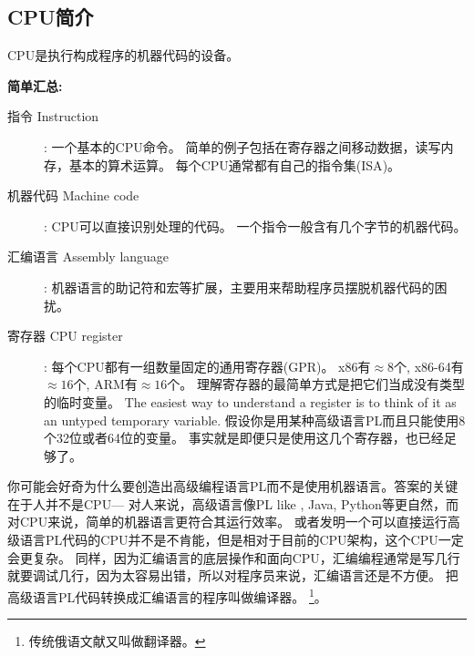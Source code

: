 \documentclass[UTF8,nofonts]{ctexart}
\begin{document}

\subsection{CPU简介}

\ac{CPU}是执行构成程序的机器代码的设备。

\textbf{简单汇总:}

\begin{description}
\item[指令 Instruction]: 一个基本的\ac{CPU}命令。
简单的例子包括在寄存器之间移动数据，读写内存，基本的算术运算。
每个\ac{CPU}通常都有自己的指令集(\ac{ISA})。

\item[机器代码 Machine code]: \ac{CPU}可以直接识别处理的代码。
一个指令一般含有几个字节的机器代码。
\item[汇编语言 Assembly language]: 机器语言的助记符和宏等扩展，主要用来帮助程序员摆脱机器代码的困扰。
\item[寄存器 CPU register]: 每个\ac{CPU}都有一组数量固定的通用寄存器(\ac{GPR})。
x86有$\approx 8$个, x86-64有$\approx 16$个, ARM有$\approx 16$个。
理解寄存器的最简单方式是把它们当成没有类型的临时变量。
The easiest way to understand a register is to think of it as an untyped temporary variable.
假设你是用某种高级语言\ac{PL}而且只能使用8个32位或者64位的变量。
事实就是即便只是使用这几个寄存器，也已经足够了。
\end{description}


你可能会好奇为什么要创造出高级编程语言\ac{PL}而不是使用机器语言。答案的关键在于人并不是\ac{CPU}---%
对人来说，高级语言像\ac{PL} like \CCpp, Java, Python等更自然，而对\ac{CPU}来说，简单的机器语言更符合其运行效率。
或者发明一个可以直接运行高级语言\ac{PL}代码的\ac{CPU}并不是不肯能，但是相对于目前的\ac{CPU}架构，这个\ac{CPU}一定会更复杂。
同样，因为汇编语言的底层操作和面向\ac{CPU}，汇编编程通常是写几行就要调试几行，因为太容易出错，所以对程序员来说，汇编语言还是不方便。
把高级语言\ac{PL}代码转换成汇编语言的程序叫做编译器。
\footnote{传统俄语文献又叫做翻译器。}。

%
%
%
\end{document}
